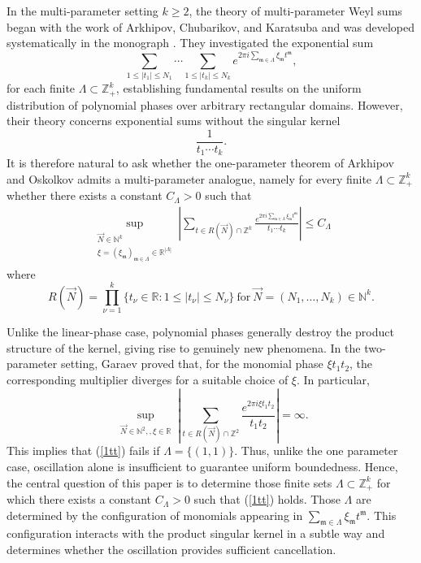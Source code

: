 \documentclass[11 pt,letterpaper]{amsart}
\theoremstyle{plain}
\theoremstyle{definition}
\theoremstyle{remark} \theoremstyle{exam} \theoremstyle{ob}
\numberwithin{equation}{section}
\begin{document}
In the multi-parameter setting $k\ge 2$, the theory of multi-parameter Weyl sums began with the work of
Arkhipov, Chubarikov, and Karatsuba \cite{AC} and was developed
systematically in the monograph \cite{ACK}.  They investigated the
exponential sum 
\[
\sum_{1\le |t_1|\le N_1}\cdots
\sum_{1\le |t_k|\le N_k}
e^{2\pi i \sum_{\mathfrak{m}\in \Lambda} \xi_{\mathfrak{m}} t^{\mathfrak{m}} },
\]
for each finite $\Lambda\subset \mathbb{Z}^k_+$,  establishing fundamental results on the uniform distribution of polynomial phases over arbitrary rectangular domains.   However, their theory concerns exponential sums without the singular
kernel
\[
\frac1{t_1\cdots t_k}.
\]
It is therefore natural to ask whether the one-parameter theorem of
Arkhipov and Oskolkov admits a multi-parameter analogue, namely  for every finite
$\Lambda\subset\mathbb Z_+^k$   whether 
there exists a constant
$C_\Lambda>0$ such that
\begin{align}\label{1tt}
	\sup_{\substack{
			\vec N\in\mathbb N^k\\
			\xi=(\xi_{\mathfrak m})_{\mathfrak m\in\Lambda}\in\mathbb R^{|\Lambda|}
	}}
	\left|
	\sum_{t\in R(\vec N)\cap \mathbb{Z}^k}
	\frac{e^{2\pi i\sum_{\mathfrak m\in\Lambda}
			\xi_{\mathfrak m}t^{\mathfrak m}}}{t_1\cdots t_k}
	\right|
	\le C_\Lambda 
\end{align}
where
\[
R(\vec N)
=
\prod_{\nu=1}^k
\{t_\nu\in \mathbb{R}:1\le |t_\nu|\le N_{\nu}\}\ \text{for}\ \vec N=(N_1,\ldots,N_k)\in\mathbb N^k.
\]

Unlike the linear-phase case, polynomial phases generally destroy the
product structure of the kernel, giving rise to genuinely new
phenomena.  In the two-parameter setting, Garaev \cite{G} proved that, for the monomial phase
$\xi t_1t_2$, the corresponding multiplier diverges for a suitable choice of $\xi$. In particular,
$$
\sup_{\substack{
		\vec N\in\mathbb N^2,,
		\xi\in\mathbb R}}
\left|
\sum_{t\in R(\vec N)\cap\mathbb Z^2}
\frac{e^{2\pi i\xi t_1t_2}}{t_1t_2}
\right|
=\infty.
$$
This implies that (\ref{1tt}) fails if $\Lambda =\{(1,1)\}$.  Thus, unlike the  one parameter case,
oscillation alone is insufficient to guarantee uniform boundedness. Hence, the central question of this paper is to determine those finite sets $\Lambda\subset\mathbb Z_+^k$
for which there exists a constant $C_\Lambda>0$ such that (\ref{1tt}) holds. Those $\Lambda$ are determined by the configuration of monomials appearing in
$\sum_{\mathfrak m\in\Lambda}\xi_{\mathfrak m}t^{\mathfrak m}$.
This configuration interacts with the product singular kernel in a subtle way
and determines whether the oscillation provides sufficient cancellation.
\end{document}
